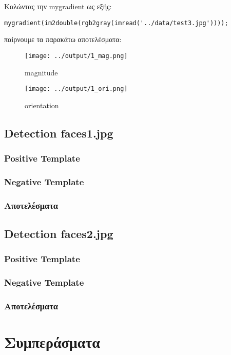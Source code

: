 \documentclass[11pt]{scrartcl} %
\begin{document}
Καλώντας την mygradient ως εξής:

\begin{verbatim}
mygradient(im2double(rgb2gray(imread('../data/test3.jpg'))));
\end{verbatim}

παίρνουμε τα παρακάτω αποτελέσματα:

\begin{figure}[H]
  \texttt{[image: ../output/1\_mag.png]}
  \caption{magnitude}
\end{figure}

\begin{figure}[H]
  \texttt{[image: ../output/1\_ori.png]}
  \caption{orientation}
\end{figure}

\subsection{Detection faces1.jpg}

\subsubsection{Positive Template}

\subsubsection{Negative Template}

\subsubsection{Αποτελέσματα}

\subsection{Detection faces2.jpg}

\subsubsection{Positive Template}

\subsubsection{Negative Template}

\subsubsection{Αποτελέσματα}

\section{Συμπεράσματα}
\end{document}
